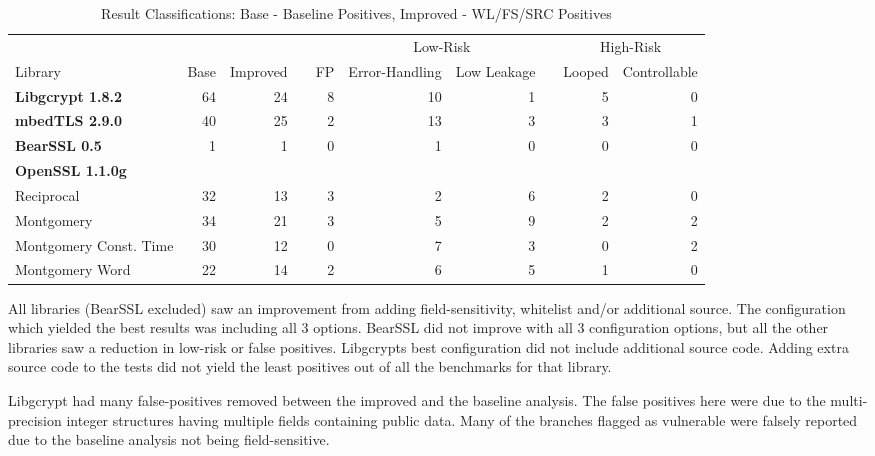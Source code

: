 \begin{table*}[!t]
  \centering
  \begin{tabular}{@{}lrr|crrrcrr@{}}
    \toprule
    &  &  &&  & \multicolumn{2}{c}{Low-Risk} && \multicolumn{2}{c}{High-Risk}\\
    \cmidrule{6-7} \cmidrule{9-10}
    Library& Base & Improved&& FP& Error-Handling & Low Leakage && Looped & Controllable \\
    \midrule
    \textbf{Libgcrypt 1.8.2}& 64 & 24 &&8 & 10 & 1 && 5 & 0\\
    \textbf{mbedTLS 2.9.0}  & 40 & 25 &&2 & 13 & 3 && 3  & 1\\
    \textbf{BearSSL 0.5}    & 1 & 1   &&0 & 1 & 0  && 0  & 0\\
    \textbf{OpenSSL 1.1.0g}\\
    \hspace{0.25cm}Reciprocal              & 32 & 13 && 3    & 2   & 6 && 2 & 0\\
    \hspace{0.25cm}Montgomery              & 34 & 21 &&  3   &  5  & 9 && 2  & 2\\
    \hspace{0.25cm}Montgomery Const. Time  & 30 & 12 &&  0   &  7  & 3 && 0   & 2\\
    \hspace{0.25cm}Montgomery Word         & 22 & 14 &&  2   & 6   & 5 && 1   & 0\\
    \bottomrule
  \end{tabular}
\caption{Result Classifications: Base - Baseline Positives, Improved - WL/FS/SRC
Positives}
  \label{tbl:allpositives}
\end{table*}


All libraries (BearSSL excluded) saw an improvement from adding
field-sensitivity, whitelist and/or additional source. The configuration which
yielded the best results was including all 3 options. BearSSL did not improve
with all 3 configuration options, but all the other libraries saw a reduction in
low-risk or false positives. Libgcrypts best configuration did not include
additional source code. Adding extra source code to the tests did not yield the
least positives out of all the benchmarks for that library.


Libgcrypt had many false-positives removed between the improved and the baseline
analysis. The false positives here were due to the multi-precision integer
structures having multiple fields containing public data. Many of the branches
flagged as vulnerable were falsely reported due to the baseline analysis not being field-sensitive.

